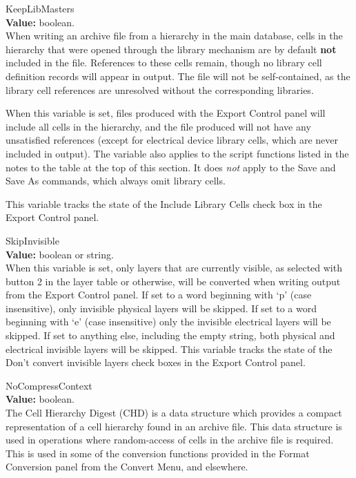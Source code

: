 \begin{description}
\item{\et KeepLibMasters}\\
{\bf Value:} boolean.\\
When writing an archive file from a hierarchy in the main database,
cells in the hierarchy that were opened through the library mechanism
are by default {\bf not} included in the file.  References to these
cells remain, though no library cell definition records will appear in
output.  The file will not be self-contained, as the library cell
references are unresolved without the corresponding libraries.

When this variable is set, files produced with the {\cb Export
Control} panel will include all cells in the hierarchy, and the file
produced will not have any unsatisfied references (except for
electrical device library cells, which are never included in output). 
The variable also applies to the script functions listed in the notes
to the table at the top of this section.  It does {\it not} apply to
the {\cb Save} and {\cb Save As} commands, which always omit library
cells.

This variable tracks the state of the {\cb Include Library Cells}
check box in the {\cb Export Control} panel.

\item{\et SkipInvisible}\\
{\bf Value:} boolean or string.\\
When this variable is set, only layers that are currently visible, as
selected with button 2 in the layer table or otherwise, will be
converted when writing output from the {\cb Export Control} panel.  If
set to a word beginning with `{\vt p}' (case insensitive), only
invisible physical layers will be skipped.  If set to a word beginning
with `{\vt e}' (case insensitive) only the invisible electrical layers
will be skipped.  If set to anything else, including the empty string,
both physical and electrical invisible layers will be skipped.  This
variable tracks the state of the {\cb Don't convert invisible layers}
check boxes in the {\cb Export Control} panel.

\item{\et NoCompressContext}\\
{\bf Value:} boolean.\\
The Cell Hierarchy Digest (CHD) is a data structure which provides a
compact representation of a cell hierarchy found in an archive file. 
This data structure is used in operations where random-access of cells
in the archive file is required.  This is used in some of the
conversion functions provided in the {\cb Format Conversion} panel
from the {\cb Convert Menu}, and elsewhere.


\end{description}
